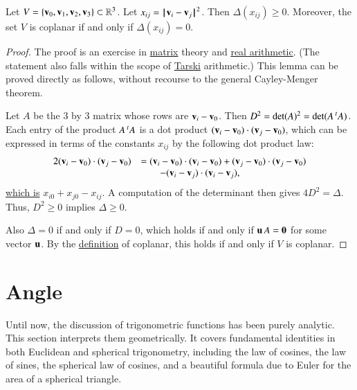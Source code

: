 \begin{lemma}\label{lemma:delta-pos}
Let $V=\{{\mathbf v}_0,{\mathbf v}_1,{\mathbf v}_2,{\mathbf v}_3\}\subset\mathbb{R}^3$.  
Let $x_{ij} = {\hskip0.1em|\hskip-0.15em|\hskip0.1em}{\mathbf v}_i - {\mathbf v}_j{\hskip0.1em|\hskip-0.15em|\hskip0.1em}^2$.
Then $\Delta(x_{ij})\ge 0$.  Moreover, the set $V$ is coplanar if and only if
$\Delta(x_{ij}) = 0$.
\end{lemma}

\begin{proof}  The proof is an exercise in \hyperref[back:matrix]{matrix} theory and \hyperref[back:analysis]{real arithmetic}.  (The statement also falls within the scope of \hyperref[back:tarski]{Tarski} arithmetic.)  This  lemma
can be proved directly as follows, without recourse to the general Cayley-Menger theorem.

Let $A$ be the $3$ by $3$ matrix whose rows are ${\mathbf v}_i - {\mathbf v}_0$.  
Then $D^2 = \det(A)^2 = \det(A \,\hbox{}^t A)$.  Each entry of the product
$A\,\hbox{}^tA$ is a dot product $({\mathbf v}_i-{\mathbf v}_0)\cdot ({\mathbf v}_j-{\mathbf v}_0)$, which can be
expressed in terms of the constants $x_{ij}$ by the following dot product law:
\begin{equation}\label{eqn:dot-law}
\begin{array}{lll}
2 ({\mathbf v}_i-{\mathbf v}_0)\cdot ({\mathbf v}_j-{\mathbf v}_0) &= ({\mathbf v}_i-{\mathbf v}_0)\cdot({\mathbf v}_i-{\mathbf v}_0) + ({\mathbf v}_j-{\mathbf v}_0)\cdot ({\mathbf v}_j-{\mathbf v}_0) \\
  &\qquad - ({\mathbf v}_i-{\mathbf v}_j)\cdot ({\mathbf v}_i-{\mathbf v}_j),
\end{array}
\end{equation}
\hyperref[def:norm]{which is} $x_{i0} + x_{j0} - x_{ij}$.
A computation of the determinant then gives $4D^2=\Delta$.
Thus, $D^2\ge0$ implies $\Delta\ge 0$.

Also $\Delta=0$ if and only if $D=0$, which holds if and only if ${\mathbf u}\, A = {\mathbf 0}$ for
some vector ${\mathbf u}$.  By the \hyperref[def:plane]{definition} of coplanar, this holds if and only if $V$ is coplanar.
\end{proof}


\section{Angle}\label{sec:angle}

Until now, the discussion of trigonometric functions has been purely analytic.  This section
interprets them geometrically.
It covers fundamental identities
in both Euclidean and spherical trigonometry, including the law
of cosines, the law of sines, the spherical law of cosines, 
and a beautiful formula due to Euler for
the area of a spherical triangle.

